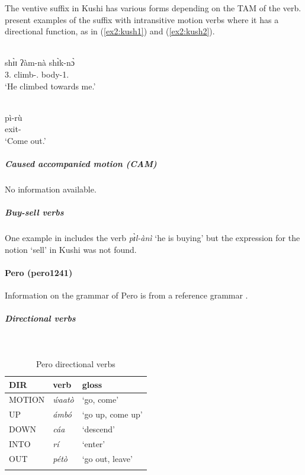 The ventive suffix in Kushi has various forms depending on the TAM of the verb. \citet{baticVerbClassesTAM2019} present examples of the suffix with intransitive motion verbs where it has a directional function, as in (\ref{ex2:kush1}) and (\ref{ex2:kush2}).

\ea\label{ex2:kush1}
 \\
\gll shɪ̀ɪ ʔàm-nà shɪ̀k-nɔ̀	\\
3. climb-. body-1.		\\
\glt `He climbed towards me.'

\ex\label{ex2:kush2}
 \\
\gll pì-rù	\\
exit-		\\
\glt `Come out.'
\z 

\subparagraph{Caused accompanied motion (CAM)}



No information available. 

\subparagraph{Buy-sell verbs}



One example in \citet[75]{baticVerbClassesTAM2019} includes the verb \textit{pɪ̀l-ànì} `he is buying' but the expression for the notion `sell' in Kushi was not found. 

\paragraph*{Pero (pero1241)} \label{pero}

Information on the grammar of Pero is from a reference grammar \citep{frajzyngierGrammarPero1989}. 

\largerpage
\subparagraph{Directional verbs}~



\begin{table}[H]
	\caption{Pero directional verbs} 
	\label{tab:peroV}
	\begin{tabular}{lll} %
		\lsptoprule
		DIR & verb & gloss   \\ %
		\midrule
		MOTION & \textit{ẃaatò} & `go, come' \\
		UP & \textit{ámbó} & `go up, come up' \\
		DOWN & \textit{cáa} & `descend' \\
		INTO& \textit{rí} & `enter' \\
		OUT & \textit{pétò} & `go out, leave'  \\
		\lspbottomrule
	\end{tabular}
\end{table}

